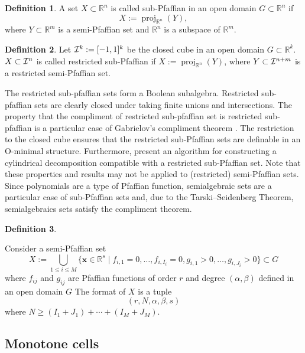 \documentclass[
]{book}
\theoremstyle{definition}
\newtheorem{definition}{Definition}[chapter]
\theoremstyle{definition}
\theoremstyle{definition}
\theoremstyle{definition}
\theoremstyle{remark}
\begin{document}
\begin{definition}
\citep[Definition 2.8]{gv04}
A set \(X \subset \mathbb{R}^n\) is called sub-Pfaffian in an open domain \(G \subset \mathbb{R}^n\) if
\[
X := {\operatorname{proj}_{\mathbb{R}^{n}}}(Y),
\]
where \(Y \subset \mathbb{R}^m\) is a semi-Pfaffian set and \(\mathbb{R}^n\) is a subspace of \(\mathbb{R}^m\).
\end{definition}

\begin{definition}
\citep[2.9]{gv04}
Let \({\cal I}^k := [-1,1]^k\) be the closed cube in an open domain \(G \subset \mathbb{R}^k\).
\(X \subset {\cal I}^n\) is called restricted sub-Pfaffian if \(X := {\operatorname{proj}_{\mathbb{R}^{n}}}(Y)\), where \(Y \subset {\cal I}^{n+m}\) is a restricted semi-Pfaffian set.
\end{definition}

The restricted sub-pfaffian sets form a Boolean subalgebra. Restricted sub-pfaffian sets are clearly closed under taking finite unions and intersections. The property that the compliment of restricted sub-pfaffian set is restricted sub-pfaffian is a particular case of Gabrielov's compliment theorem \citep{gabrielov1996}. The restriction to the closed cube ensures that the restricted sub-Pfaffian sets are definable in an O-minimal structure. Furthermore, \citet{gv01} present an algorithm for constructing a cylindrical decomposition compatible with a restricted sub-Pfaffian set. Note that these properties and results may not be applied to (restricted) semi-Pfaffian sets. Since polynomials are a type of Pfaffian function, semialgebraic sets are a particular case of sub-Pfaffian sets and, due to the Tarski--Seidenberg Theorem, semialgebraics sets satisfy the compliment theorem.

\begin{definition}
\protect\hypertarget{def:pfaff-format}{}\label{def:pfaff-format}\citep[Definition 2.11]{gv04}

Consider a semi-Pfaffian set
\[
X := \bigcup_{1 \le i \le M} \{ \mathbf{x} \in \mathbb{R}^s \mid f_{i,1} = 0, \ldots, f_{i,I_i} = 0, g_{i,1} > 0, \ldots, g_{i,J_i} > 0 \} \subset G
\]
where \(f_{ij}\) and \(g_{ij}\) are Pfaffian functions of order \(r\) and degree \((\alpha, \beta)\) defined in an open domain \(G\)
The format of \(X\) is a tuple
\[
(r, N, \alpha, \beta, s)
\]
where \(N \ge (I_1 + J_1) + \cdots + (I_M + J_M)\).
\end{definition}

\hypertarget{monotone-cells}{%
\subsection{Monotone cells}\label{monotone-cells}}
\end{document}
